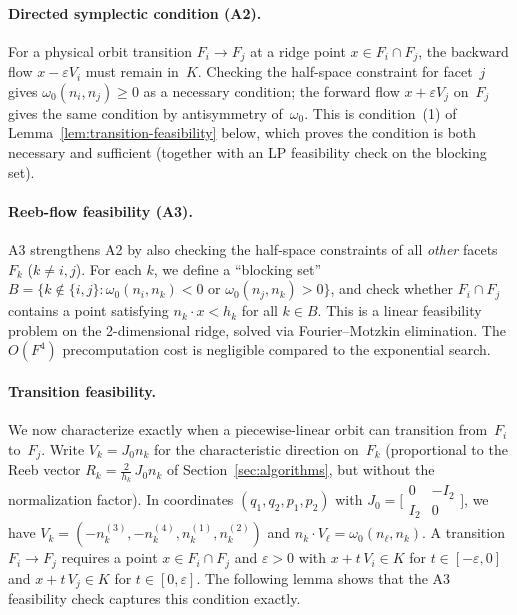 \paragraph{Directed symplectic condition (A2).}
For a physical orbit transition $F_i \to F_j$ at a ridge point $x \in F_i \cap F_j$,
the backward flow $x - \varepsilon V_i$ must remain in~$K$.
Checking the half-space constraint for facet~$j$ gives
$\omega_0(n_i, n_j) \ge 0$ as a necessary condition;
the forward flow $x + \varepsilon V_j$ on~$F_j$ gives the same condition
by antisymmetry of~$\omega_0$.
This is condition~(1) of Lemma~\ref{lem:transition-feasibility} below,
which proves the condition is both necessary and sufficient
(together with an LP feasibility check on the blocking set).

\paragraph{Reeb-flow feasibility (A3).}
A3 strengthens A2 by also checking the half-space constraints of all \emph{other}
facets $F_k$ ($k \neq i, j$).
For each $k$, we define a ``blocking set''
$B = \{k \notin \{i,j\} : \omega_0(n_i, n_k) < 0 \text{ or } \omega_0(n_j, n_k) > 0\}$,
and check whether $F_i \cap F_j$ contains a point satisfying
$n_k \cdot x < h_k$ for all $k \in B$.
This is a linear feasibility problem on the 2-dimensional ridge,
solved via Fourier--Motzkin elimination.
The $O(F^4)$ precomputation cost is negligible compared to the exponential search.

\paragraph{Transition feasibility.}
We now characterize exactly when a piecewise-linear orbit can
transition from~$F_i$ to~$F_j$.
Write $V_k = J_0 n_k$ for the characteristic direction on~$F_k$
(proportional to the Reeb vector $R_k = \tfrac{2}{h_k}\, J_0 n_k$
of Section~\ref{sec:algorithms}, but without the normalization factor).
In coordinates $(q_1, q_2, p_1, p_2)$ with
$J_0 = \bigl[\begin{smallmatrix} 0 & -I_2 \\ I_2 & 0 \end{smallmatrix}\bigr]$,
we have $V_k = (-n_k^{(3)}, -n_k^{(4)}, n_k^{(1)}, n_k^{(2)})$
and $n_k \cdot V_\ell = \omega_0(n_\ell, n_k)$.
A transition $F_i \to F_j$ requires a point $x \in F_i \cap F_j$
and $\varepsilon > 0$ with
$x + t\, V_i \in K$ for $t \in [-\varepsilon, 0]$
and $x + t\, V_j \in K$ for $t \in [0, \varepsilon]$.
The following lemma shows that the A3 feasibility check
captures this condition exactly.

